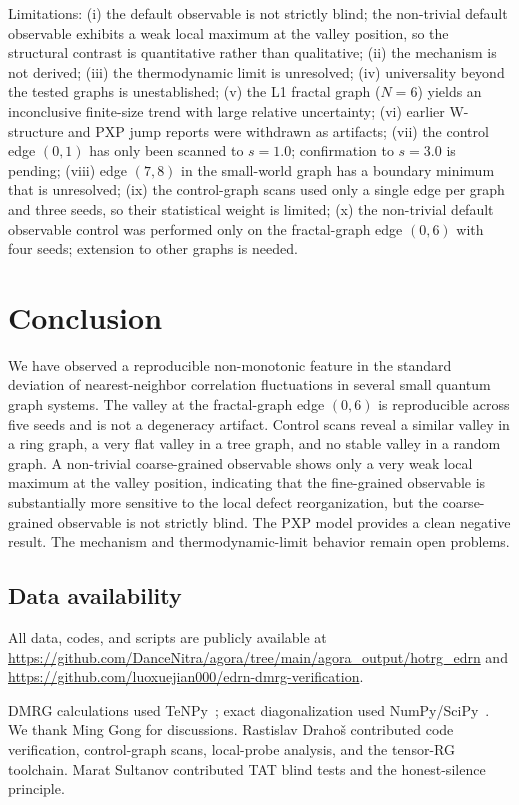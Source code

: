 \documentclass[aps,prb,reprint,superscriptaddress]{revtex4-2}
\begin{document}
Limitations: (i) the default observable is not strictly blind; the non-trivial default observable exhibits a weak local maximum at the valley position, so the structural contrast is quantitative rather than qualitative; (ii) the mechanism is not derived; (iii) the thermodynamic limit is unresolved; (iv) universality beyond the tested graphs is unestablished; (v) the L1 fractal graph ($N=6$) yields an inconclusive finite-size trend with large relative uncertainty; (vi) earlier W-structure and PXP jump reports were withdrawn as artifacts; (vii) the control edge $(0,1)$ has only been scanned to $s=1.0$; confirmation to $s=3.0$ is pending; (viii) edge $(7,8)$ in the small-world graph has a boundary minimum that is unresolved; (ix) the control-graph scans used only a single edge per graph and three seeds, so their statistical weight is limited; (x) the non-trivial default observable control was performed only on the fractal-graph edge $(0,6)$ with four seeds; extension to other graphs is needed.

\section{Conclusion}

We have observed a reproducible non-monotonic feature in the standard deviation of nearest-neighbor correlation fluctuations in several small quantum graph systems. The valley at the fractal-graph edge $(0,6)$ is reproducible across five seeds and is not a degeneracy artifact. Control scans reveal a similar valley in a ring graph, a very flat valley in a tree graph, and no stable valley in a random graph. A non-trivial coarse-grained observable shows only a very weak local maximum at the valley position, indicating that the fine-grained observable is substantially more sensitive to the local defect reorganization, but the coarse-grained observable is not strictly blind. The PXP model provides a clean negative result. The mechanism and thermodynamic-limit behavior remain open problems.

\subsection*{Data availability}
All data, codes, and scripts are publicly available at \url{https://github.com/DanceNitra/agora/tree/main/agora_output/hotrg_edrn} and \url{https://github.com/luoxuejian000/edrn-dmrg-verification}.

\begin{acknowledgments}
DMRG calculations used TeNPy~\cite{Hauschild2018,Schollwock2011}; exact diagonalization used NumPy/SciPy~\cite{Harris2020}. We thank Ming Gong for discussions. Rastislav Draho\v{s} contributed code verification, control-graph scans, local-probe analysis, and the tensor-RG toolchain. Marat Sultanov contributed TAT blind tests and the honest-silence principle.
\end{acknowledgments}
\end{document}
